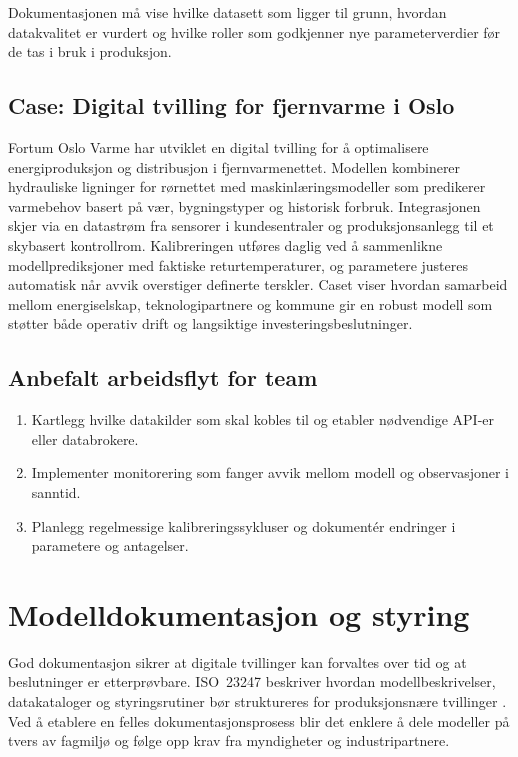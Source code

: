 Dokumentasjonen må vise hvilke datasett som ligger til grunn, hvordan datakvalitet er vurdert og hvilke roller som godkjenner nye
parameterverdier før de tas i bruk i produksjon.

\subsection{Case: Digital tvilling for fjernvarme i Oslo}
Fortum Oslo Varme har utviklet en digital tvilling for å optimalisere energiproduksjon og distribusjon i fjernvarmenettet.
Modellen kombinerer hydrauliske ligninger for rørnettet med maskinlæringsmodeller som predikerer varmebehov basert på vær,
bygningstyper og historisk forbruk. Integrasjonen skjer via en datastrøm fra sensorer i kundesentraler og produksjonsanlegg til
et skybasert kontrollrom. Kalibreringen utføres daglig ved å sammenlikne modellprediksjoner med faktiske returtemperaturer, og
parametere justeres automatisk når avvik overstiger definerte terskler. Caset viser hvordan samarbeid mellom energiselskap,
teknologipartnere og kommune gir en robust modell som støtter både operativ drift og langsiktige investeringsbeslutninger.

\subsection{Anbefalt arbeidsflyt for team}
\begin{enumerate}
    \item Kartlegg hvilke datakilder som skal kobles til og etabler nødvendige API-er eller databrokere.
    \item Implementer monitorering som fanger avvik mellom modell og observasjoner i sanntid.
    \item Planlegg regelmessige kalibreringssykluser og dokumentér endringer i parametere og antagelser.
\end{enumerate}

\section{Modelldokumentasjon og styring}
God dokumentasjon sikrer at digitale tvillinger kan forvaltes over tid og at beslutninger er etterprøvbare. ISO~23247 beskriver hvordan modellbeskrivelser, datakataloger og styringsrutiner bør struktureres for produksjonsnære tvillinger \citep{iso23247-2021}. Ved å etablere en felles dokumentasjonsprosess blir det enklere å dele modeller på tvers av fagmiljø og følge opp krav fra myndigheter og industripartnere.

